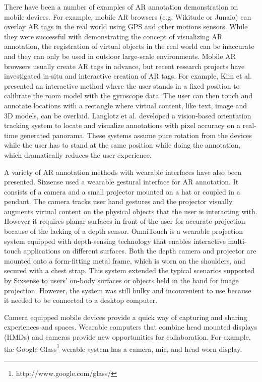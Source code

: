 There have been a number of examples of AR annotation demonstration on mobile devices. For example, mobile AR browsers (e.g. Wikitude or Junaio) can overlay AR tags in the real world using  GPS and other motions sensors. While they were successful with demonstrating the concept of visualizing AR annotation, the registration of virtual objects in the real world can be inaccurate and they can only be used in outdoor large-scale environments. Mobile AR browsers usually create AR tags in advance, but recent research projects have investigated in-situ and interactive creation of AR tags. For example, Kim et al. \cite{Kim:2011:IAS} presented an interactive method where the user stands in a fixed position to calibrate the room model with the gyroscope data. The user can then touch and annotate locations with a rectangle where virtual content, like text, image and 3D models, can be overlaid.  Langlotz et al. \cite{Langlotz:2012:OCP} developed a vision-based orientation tracking system to locate and visualize annotations with pixel accuracy on a real-time generated panorama. These systems assume pure rotation from the devices while the user has to stand at the same position while doing the annotation, which dramatically reduces the user experience.

A variety of AR annotation methods with wearable interfaces have also been presented. Sixsense \cite{Mistry:2009:WWU} used a wearable gestural interface for AR annotation. It consists of a camera and a small projector mounted on a hat or coupled in a pendant. The camera tracks user hand gestures and the projector visually augments virtual content on the physical objects that the user is interacting with. However it requires planar surfaces in front of the user for accurate projection because of the lacking of a depth sensor. OmniTouch \cite{Harrison:2011:OTW} is a wearable projection system equipped with depth-sensing technology that enables interactive multi-touch applications on different surfaces. Both the depth camera and projector are mounted onto a form-fitting metal frame, which is worn on the shoulders, and secured with a chest strap. This system extended the typical scenarios supported by Sixsense to  users' on-body surfaces or objects held in the hand for image projection. However, the system was still bulky and inconvenient to use because it needed to be connected to a desktop computer.

Camera equipped mobile devices provide a quick way of capturing and sharing experiences and spaces. Wearable
computers that combine head mounted displays (HMDs) and cameras provide new opportunities for collaboration. For example, the Google Glass\footnote{http://www.google.com/glass/} werable system has a camera, mic, and head worn display.

